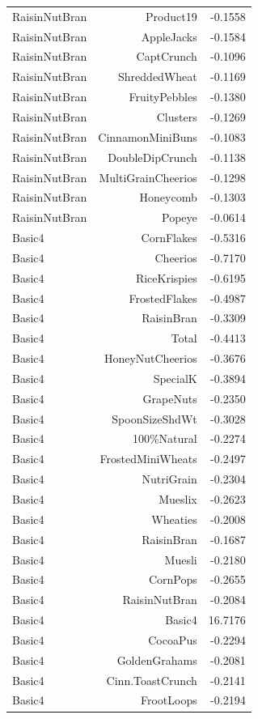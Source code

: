 \begin{longtable}{@{}lrr@{}}
RaisinNutBran & Product19 & -0.1558 \\
RaisinNutBran & AppleJacks & -0.1584 \\
RaisinNutBran & CaptCrunch & -0.1096 \\
RaisinNutBran & ShreddedWheat & -0.1169 \\
RaisinNutBran & FruityPebbles & -0.1380 \\
RaisinNutBran & Clusters & -0.1269 \\
RaisinNutBran & CinnamonMiniBuns & -0.1083 \\
RaisinNutBran & DoubleDipCrunch & -0.1138 \\
RaisinNutBran & MultiGrainCheerios & -0.1298 \\
RaisinNutBran & Honeycomb & -0.1303 \\
RaisinNutBran & Popeye & -0.0614 \\
Basic4 & CornFlakes & -0.5316 \\
Basic4 & Cheerios & -0.7170 \\
Basic4 & RiceKrispies & -0.6195 \\
Basic4 & FrostedFlakes & -0.4987 \\
Basic4 & RaisinBran & -0.3309 \\
Basic4 & Total & -0.4413 \\
Basic4 & HoneyNutCheerios & -0.3676 \\
Basic4 & SpecialK & -0.3894 \\
Basic4 & GrapeNuts & -0.2350 \\
Basic4 & SpoonSizeShdWt & -0.3028 \\
Basic4 & 100\%Natural & -0.2274 \\
Basic4 & FrostedMiniWheats & -0.2497 \\
Basic4 & NutriGrain & -0.2304 \\
Basic4 & Mueslix & -0.2623 \\
Basic4 & Wheaties & -0.2008 \\
Basic4 & RaisinBran & -0.1687 \\
Basic4 & Muesli & -0.2180 \\
Basic4 & CornPops & -0.2655 \\
Basic4 & RaisinNutBran & -0.2084 \\
Basic4 & Basic4 & 16.7176 \\
Basic4 & CocoaPus & -0.2294 \\
Basic4 & GoldenGrahams & -0.2081 \\
Basic4 & Cinn.ToastCrunch & -0.2141 \\
Basic4 & FrootLoops & -0.2194 \\

\end{longtable}
